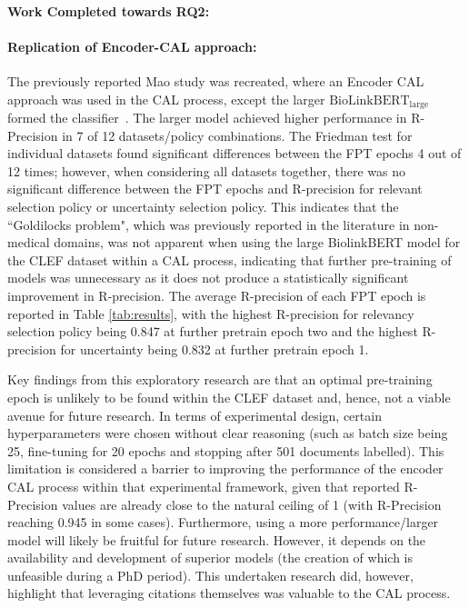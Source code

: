 \documentclass[10pt,oneside]{book}
\begin{document}
\paragraph{Work Completed towards RQ2: }

\paragraph{Replication of Encoder-CAL approach: }
The previously reported Mao study was recreated, where an Encoder CAL approach was used in the CAL process, except the larger $\text{BioLinkBERT}_{\text{large}}$ formed the classifier~\cite{mao_reproducibility_2024}. The larger model achieved higher performance in R-Precision in 7 of 12 datasets/policy combinations. The Friedman test for individual datasets found significant differences between the FPT epochs 4 out of 12 times; however, when considering all datasets together, there was no significant difference between the FPT epochs and R-precision for relevant selection policy or uncertainty selection policy. This indicates that the ``Goldilocks problem", which was previously reported in the literature in non-medical domains, was not apparent when using the large BiolinkBERT model for the CLEF dataset within a CAL process, indicating that further pre-training of models was unnecessary as it does not produce a statistically significant improvement in R-precision. The average R-precision of each FPT epoch is reported in Table \ref{tab:results}, with the highest R-precision for relevancy selection policy being 0.847 at further pretrain epoch two and the highest R-precision for uncertainty being 0.832 at further pretrain epoch 1.

Key findings from this exploratory research are that an optimal pre-training epoch is unlikely to be found within the CLEF dataset and, hence, not a viable avenue for future research. In terms of experimental design, certain hyperparameters
were chosen without clear reasoning (such as batch size being 25, fine-tuning for 20 epochs and stopping after 501 documents labelled). This limitation is considered a barrier to improving the performance of the encoder CAL
process within that experimental framework, given that reported R-Precision values are already close to the natural ceiling of 1 (with R-Precision reaching 0.945 in some cases). Furthermore, using a more performance/larger model will likely be fruitful for future research. However, it depends on the availability and development of superior models (the creation of which is unfeasible during a PhD period). This undertaken research did, however, highlight that leveraging citations themselves was valuable to the CAL process. 
\end{document}
